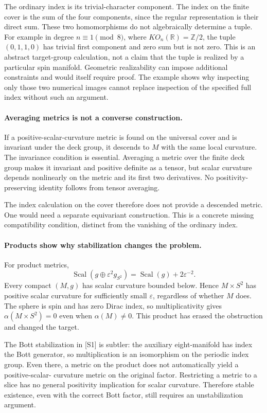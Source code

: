 \documentclass[11pt]{article}
\begin{document}
The ordinary index is its trivial-character
component. The index on the finite cover is
the sum of the four components, since the
regular representation is their direct sum.
These two homomorphisms do not algebraically
determine a tuple. For example in degree
$n\equiv1\pmod8$, where $KO_n(\mathbb R)=\mathbb Z/2$,
the tuple $(0,1,1,0)$ has trivial first component
and zero sum but is not zero. This is an
abstract target-group calculation, not a
claim that the tuple is realized by a
particular spin manifold. Geometric
realizability can impose additional constraints
and would itself require proof. The example
shows why inspecting only those two numerical
images cannot replace inspection of the
specified full index without such an argument.

\paragraph{Averaging metrics is not a converse construction.}
If a positive-scalar-curvature metric is found on the
universal cover and is invariant under the deck group,
it descends to $M$ with the same local curvature.
The invariance condition is essential. Averaging
a metric over the finite deck group makes it
invariant and positive definite as a tensor,
but scalar curvature depends nonlinearly
on the metric and its first two derivatives.
No positivity-preserving identity follows
from tensor averaging.

The index calculation on the cover therefore
does not provide a descended metric. One
would need a separate equivariant construction.
This is a concrete missing compatibility
condition, distinct from the vanishing of
the ordinary index.

\paragraph{Products show why stabilization changes the problem.}
For product metrics,
\[
 \operatorname{Scal}(g\oplus\varepsilon^2g_{S^2})
                 =\operatorname{Scal}(g)+2\varepsilon^{-2}.
\]
Every compact $(M,g)$ has scalar curvature bounded
below. Hence $M\times S^2$ has positive scalar
curvature for sufficiently small $\varepsilon$,
regardless of whether $M$ does. The sphere is
spin and has zero Dirac index, so multiplicativity
gives $\alpha(M\times S^2)=0$ even when
$\alpha(M)\ne0$. This product has erased
the obstruction and changed the target.

The Bott stabilization in [S1] is subtler:
the auxiliary eight-manifold has index the
Bott generator, so multiplication is an
isomorphism on the periodic index group.
Even there, a metric on the product does
not automatically yield a positive-scalar-
curvature metric on the original factor.
Restricting a metric to a slice has no
general positivity implication for scalar
curvature. Therefore stable existence,
even with the correct Bott factor, still
requires an unstabilization argument.
\end{document}
